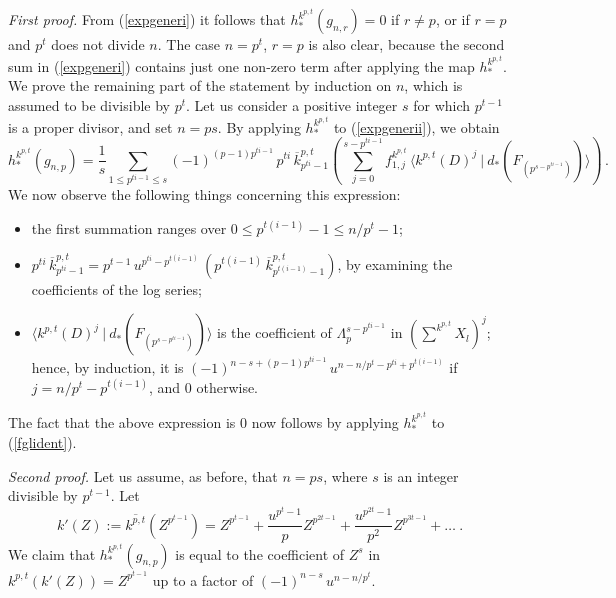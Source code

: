 \documentclass[a4paper,12pt]{amsart}
\theoremstyle{definition}
\numberwithin{equation}{section}
\newcommand{\br}[1]{\langle#1\rangle}
\newcommand{\dual}[2]{\br{#1 \:|\: #2}}
\begin{document}
{\em First proof.} From (\ref{expgeneri}) it follows that $h_*^{k^{p,t}}(g_{n,r})=0$ if $r\ne p$, or if $r=p$ and $p^t$ does not divide $n$. The case $n=p^t$, $r=p$ is also clear, because the second sum in (\ref{expgeneri}) contains just one non-zero term after applying the map $h_*^{k^{p,t}}$. We prove the remaining part of the statement by induction on $n$, which is assumed to be divisible by $p^t$. Let us consider a positive integer $s$ for which $p^{t-1}$ is a proper divisor, and set $n=ps$. By applying $h_*^{k^{p,t}}$ to (\ref{expgenerii}), we obtain
\[h_*^{k^{p,t}}(g_{n,p})=\frac{1}{s}\sum_{1\le p^{ti-1}\le s} (-1)^{(p-1)p^{ti-1}}\,p^{ti}\,\overline{k}_{p^{ti}-1}^{p,t}\left(\sum_{j=0}^{s-p^{ti-1}}f_{1,j}^{k^{p,t}}\,\dual{k^{p,t}(D)^j}{d_*(F_{(p^{s-p^{ti-1}})})}\right)\,.\]
We now observe the following things concerning this expression:
\begin{itemize}
\item the first summation ranges over $0\le p^{t(i-1)}-1\le n/p^t-1$;
\item $p^{ti}\,\overline{k}_{p^{ti}-1}^{p,t}=p^{t-1}\,u^{p^{ti}-p^{t(i-1)}}\,(p^{t(i-1)}\,\overline{k}_{p^{t(i-1)}-1}^{p,t})$, by examining the coefficients of the log series;
\item $\dual{k^{p,t}(D)^j}{d_*(F_{(p^{s-p^{ti-1}})})}$ is the coefficient of $\varLambda_p^{s-p^{ti-1}}$ in $\left(\sum^{k^{p,t}}X_l\right)^j$; hence, by induction, it is $(-1)^{n-s+(p-1)p^{ti-1}}\,u^{n-n/p^t-p^{ti}+p^{t(i-1)}}$ if $j=n/p^t-p^{t(i-1)}$, and $0$ otherwise.
\end{itemize}
The fact that the above expression is $0$ now follows by applying $h_*^{k^{p,t}}$ to (\ref{fglident}).

{\em Second proof.} Let us assume, as before, that $n=ps$, where $s$ is an integer divisible by $p^{t-1}$. Let
\[k'(Z):=\overline{k^{p,t}}(Z^{p^{t-1}})=Z^{p^{t-1}}+\frac{u^{p^t-1}}{p} Z^{p^{2t-1}}+\frac{u^{p^{2t}-1}}{p^2} Z^{p^{3t-1}}+\ldots\:.\]
We claim that $h_*^{k^{p,t}}(g_{n,p})$ is equal to the coefficient of $Z^s$ in $k^{p,t}(k'(Z))=Z^{p^{t-1}}$ up to a factor of $(-1)^{n-s}\,u^{n-n/p^t}$. 
\end{document}
